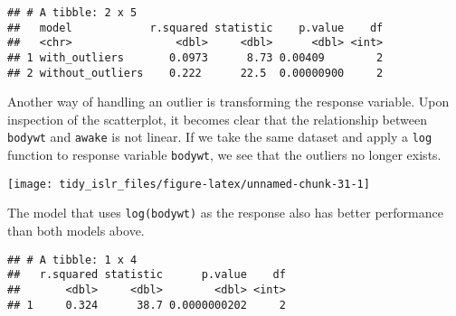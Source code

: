 \documentclass[]{book}
\newenvironment{Shaded}{\begin{snugshade}}{\end{snugshade}}
\newcommand{\DataTypeTok}[1]{\textcolor[rgb]{0.13,0.29,0.53}{#1}}
\newcommand{\KeywordTok}[1]{\textcolor[rgb]{0.13,0.29,0.53}{\textbf{#1}}}
\newcommand{\NormalTok}[1]{#1}
\newcommand{\OperatorTok}[1]{\textcolor[rgb]{0.81,0.36,0.00}{\textbf{#1}}}
\newcommand{\StringTok}[1]{\textcolor[rgb]{0.31,0.60,0.02}{#1}}
\begin{document}
\begin{verbatim}
## # A tibble: 2 x 5
##   model            r.squared statistic    p.value    df
##   <chr>                <dbl>     <dbl>      <dbl> <int>
## 1 with_outliers       0.0973      8.73 0.00409        2
## 2 without_outliers    0.222      22.5  0.00000900     2
\end{verbatim}

Another way of handling an outlier is transforming the response variable. Upon inspection of the scatterplot, it becomes clear that the relationship between \texttt{bodywt} and \texttt{awake} is not linear. If we take the same dataset and apply a \texttt{log} function to response variable \texttt{bodywt}, we see that the outliers no longer exists.

\begin{Shaded}
\end{Shaded}

\begin{center}\texttt{[image: tidy\_islr\_files/figure-latex/unnamed-chunk-31-1]} \end{center}

The model that uses \texttt{log(bodywt)} as the response also has better performance than both models above.

\begin{Shaded}
\end{Shaded}

\begin{verbatim}
## # A tibble: 1 x 4
##   r.squared statistic      p.value    df
##       <dbl>     <dbl>        <dbl> <int>
## 1     0.324      38.7 0.0000000202     2
\end{verbatim}
\end{document}
